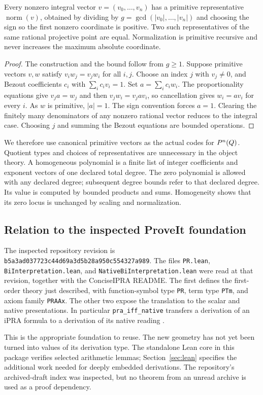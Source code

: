 \begin{lemma}\label{lem:normalize}
Every nonzero integral vector $v=(v_0,\ldots,v_n)$ has a primitive
representative $\operatorname{norm}(v)$, obtained by dividing by
$g=\gcd(|v_0|,\ldots,|v_n|)$ and choosing the sign so the first nonzero
coordinate is positive. Two such representatives of the same rational
projective point are equal. Normalization is primitive recursive and never
increases the maximum absolute coordinate.
\end{lemma}
\begin{proof}
The construction and the bound follow from $g\ge1$. Suppose primitive
vectors $v,w$ satisfy $v_iw_j=v_jw_i$ for all $i,j$. Choose an index $j$
with $v_j\ne0$, and Bezout coefficients $c_i$ with $\sum_i c_iv_i=1$.
Set $a=\sum_i c_iw_i$. The proportionality equations give $v_ja=w_j$ and
then $v_jw_i=v_ja v_i$, so cancellation gives $w_i=av_i$ for every $i$.
As $w$ is primitive, $|a|=1$. The sign convention forces $a=1$.
Clearing the finitely many denominators of any nonzero rational vector
reduces to the integral case. Choosing $j$ and summing the Bezout equations
are bounded operations.
\end{proof}

We therefore use canonical primitive vectors as the actual codes for
$P^n(Q)$. Quotient types and choices of representatives are unnecessary
in the object theory. A homogeneous polynomial is a finite list of integer
coefficients and exponent vectors of one declared total degree. The zero
polynomial is allowed with any declared degree; subsequent degree bounds
refer to that declared degree. Its value is computed
by bounded products and sums. Homogeneity shows that its zero locus is
unchanged by scaling and normalization.

\subsection{Relation to the inspected ProveIt foundation}

The inspected repository revision is
\texttt{b5a3ad037723c44d69a3d5b28a950c554327a989}.
The files \texttt{PR.lean}, \texttt{BiInterpretation.lean}, and
\texttt{NativeBiInterpretation.lean} were read at that revision, together
with the ConciseIPRA README. The first defines the first-order theory just
described, with function-symbol type \texttt{PR}, term type \texttt{PTm},
and axiom family \texttt{PRAAx}. The other two expose the translation to the
scalar and native presentations. In particular
\texttt{pra\_iff\_native} transfers a derivation of an iPRA formula to a
derivation of its native reading \cite{proveit}.

This is the appropriate foundation to reuse. The new geometry has not yet
been turned into values of its derivation type. The standalone Lean core in
this package verifies selected arithmetic lemmas; Section~\ref{sec:lean}
specifies the additional work needed for deeply embedded derivations. The
repository's archived-draft index was inspected, but no theorem from an
unread archive is used as a proof dependency.
